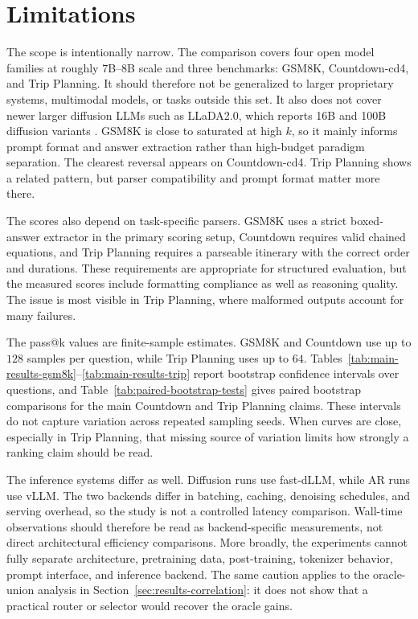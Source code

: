 \section{Limitations}
\label{sec:limitations}

The scope is intentionally narrow. The comparison covers four open model
families at roughly $7$B--$8$B scale and three benchmarks: GSM8K,
Countdown-cd4, and Trip Planning. It should therefore not be generalized to
larger proprietary systems, multimodal models, or tasks outside this set. It
also does not cover newer larger diffusion LLMs such as LLaDA2.0, which reports
16B and 100B diffusion variants \cite{bie2025llada20}. GSM8K is close to
saturated at high $k$, so it mainly informs prompt format and answer extraction
rather than high-budget paradigm separation. The clearest reversal appears on
Countdown-cd4. Trip Planning shows a related pattern, but parser compatibility
and prompt format matter more there.

The scores also depend on task-specific parsers. GSM8K uses a strict
boxed-answer extractor in the primary scoring setup, Countdown requires valid
chained equations, and Trip Planning requires a parseable itinerary with the
correct order and durations. These requirements are appropriate for structured
evaluation, but the measured scores include formatting compliance as well as
reasoning quality. The issue is most visible in Trip Planning, where malformed
outputs account for many failures.

The pass@k values are finite-sample estimates. GSM8K and Countdown use up to
$128$ samples per question, while Trip Planning uses up to $64$.
Tables~\ref{tab:main-results-gsm8k}--\ref{tab:main-results-trip} report
bootstrap confidence intervals over questions, and
Table~\ref{tab:paired-bootstrap-tests} gives paired bootstrap comparisons for
the main Countdown and Trip Planning claims. These intervals do not capture
variation across repeated sampling seeds. When curves are close, especially in
Trip Planning, that missing source of variation limits how strongly a ranking
claim should be read.

The inference systems differ as well. Diffusion runs use fast-dLLM, while AR
runs use vLLM. The two backends differ in batching, caching, denoising
schedules, and serving overhead, so the study is not a controlled latency
comparison. Wall-time observations should therefore be read as backend-specific
measurements, not direct architectural efficiency comparisons. More broadly,
the experiments cannot fully separate architecture, pretraining data,
post-training, tokenizer behavior, prompt interface, and inference backend. The
same caution applies to the oracle-union analysis in
Section~\ref{sec:results-correlation}: it does not show that a practical router
or selector would recover the oracle gains.
